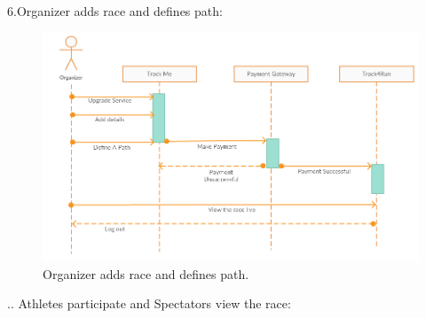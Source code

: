 6.Organizer adds race and defines path:
\begin{figure}[H]
	\begin{center}
		\includegraphics[width=\textwidth]{./RASD_Sequence/6_Organizer.png}
      	\caption{Organizer adds race and defines path.}
        \label{TrackMe_seq6}
	\end{center}
\end{figure}
.\newline\newline\newline\newline\newline\newline\newline\newline\newline\newline\newline\newline\newline\newline\newline\newline\newline\newline{}. Athletes participate and Spectators view the race:
